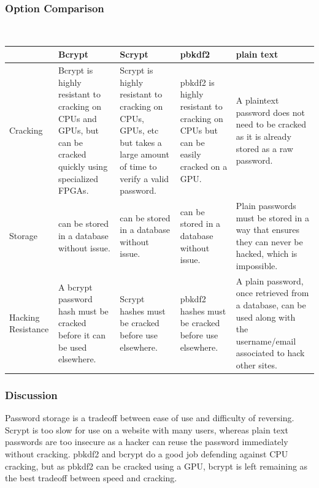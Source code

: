 \documentclass[onecolumn, draftclsnofoot,10pt, compsoc]{IEEEtran}
\begin{document}
{{ \par}

\newpage
\subsubsection{Option Comparison} ~\\

\tablehead{}
\begin{supertabular}{|p{2.5cm}|p{3.3cm}|p{3.3cm}|p{3.3cm}|p{3.3cm}|}
\hline
	& Bcrypt
	& Scrypt
	& pbkdf2
	& plain text \\
\hline
	Cracking
	& Bcrypt is highly resistant to cracking on CPUs and GPUs,
  		but can be cracked quickly using specialized FPGAs.
	& Scrypt is highly resistant to cracking on CPUs, GPUs, etc but
  		takes a large amount of time to verify a valid password.
	& pbkdf2 is highly resistant to cracking on CPUs but can be easily cracked on a GPU.
	& A plaintext password does not need to be cracked as it is already stored as a raw password. \\
\hline
	Storage
	& can be stored in a database without issue.
	& can be stored in a database without issue.
	& can be stored in a database without issue.
  	& Plain passwords must be stored in a way that ensures they can
  		never be hacked, which is impossible. \\
\hline
	Hacking \hspace{3em} Resistance
  	& A bcrypt password hash must be cracked before it can be used elsewhere.
  	& Scrypt hashes must be cracked before use elsewhere.
  	& pbkdf2 hashes must be cracked before use elsewhere.
  	& A plain password, once retrieved from a database, can be used along with
  		the username/email associated to hack other sites. \\
\hline
\end{supertabular}

\medskip

\subsubsection{Discussion}
\noindent
Password storage is a tradeoff between ease of use and difficulty of reversing.
Scrypt is too slow for use on a website with many users, whereas plain text passwords are
too insecure as a hacker can reuse the password immediately without cracking. pbkdf2 and
bcrypt do a good job defending against CPU cracking, but as pbkdf2 can be cracked using a
GPU, bcrypt is left remaining as the best tradeoff between speed and cracking.


}
\end{document}
